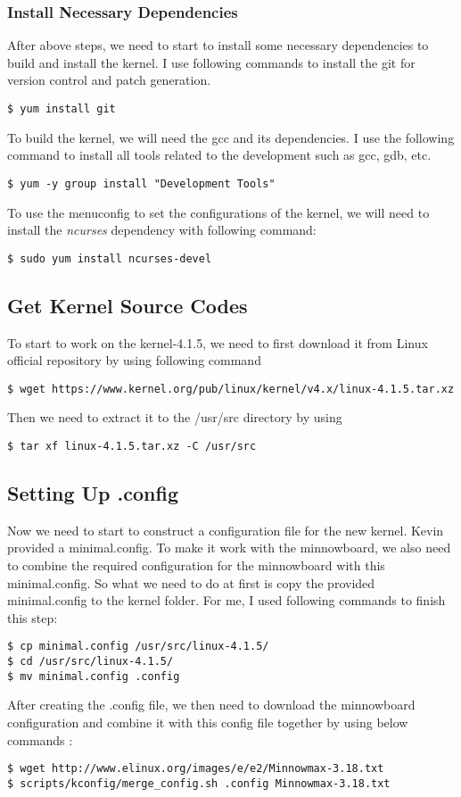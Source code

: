 \documentclass[letterpaper,10pt,onecolumn]{IEEEtran}
\begin{document}
\subsubsection{Install Necessary Dependencies}
After above steps, we need to start to install some necessary dependencies to build and install the kernel. I use following commands to install the git for version control and patch generation.
\begin{verbatim}
$ yum install git
\end{verbatim}
To build the kernel, we will need the gcc and its dependencies. I use the following command to install all tools related to the development such as gcc, gdb, etc.
\begin{verbatim}
$ yum -y group install "Development Tools"
\end{verbatim}
To use the menuconfig to set the configurations of the kernel, we will need to install the \emph{ncurses} dependency with following command:
\begin{verbatim}
$ sudo yum install ncurses-devel
\end{verbatim}
\subsection{Get Kernel Source Codes}
To start to work on the kernel-4.1.5, we need to first download it from Linux official repository by using following command
\begin{verbatim}
$ wget https://www.kernel.org/pub/linux/kernel/v4.x/linux-4.1.5.tar.xz
\end{verbatim}
Then we need to extract it to the /usr/src directory by using
\begin{verbatim}
$ tar xf linux-4.1.5.tar.xz -C /usr/src
\end{verbatim}
\subsection{Setting Up .config}
Now we need to start to construct a configuration file for the new kernel. Kevin provided a minimal.config. To make it work with the minnowboard, we also need to combine the required configuration for the minnowboard with this minimal.config. So what we need to do at first is copy the provided minimal.config to the kernel folder. For me, I used following commands to finish this step:
\begin{verbatim}
$ cp minimal.config /usr/src/linux-4.1.5/
$ cd /usr/src/linux-4.1.5/
$ mv minimal.config .config
\end{verbatim}
After creating the .config file, we then need to download the minnowboard configuration and combine it with this config file together by using below commands \cite{minnowboard}:
\begin{verbatim}
$ wget http://www.elinux.org/images/e/e2/Minnowmax-3.18.txt
$ scripts/kconfig/merge_config.sh .config Minnowmax-3.18.txt
\end{verbatim}
\end{document}
